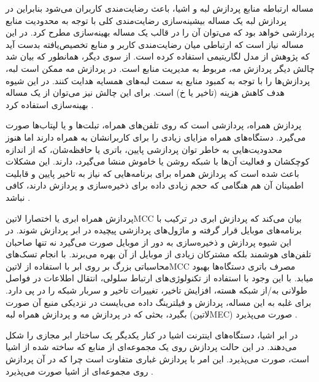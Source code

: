 مساله ارتباطه منابع پردازش لبه و اشیا، باعث رضایت‌مندی کاربران می‌شود بنابراین در پردازش لبه یک مساله بیشینه‌سازی رضایت‌مندی کلی با توجه به محدودیت منابع پردازشی خواهد بود
که می‌توان آن را در قالب یک مساله بهینه‌سازی مطرح کرد. در این مساله نیاز است که ارتباطی میان رضایت‌مندی کاربر و منابع تخصیص‌یافته بدست آید که پژوهش  از مدل
لگاریتیمی استفاده کرده است.
از سوی دیگر، همانطور که بیان شد چالش دیگر پردازش مه، مربوط به مدیریت منابع است. در پردازش مه ممکن است لبه‌، پردازش‌ها را با توجه به کمبود منابع به سمت لبه‌های همسایه هدایت کنند.
در این شیوه هدف کاهش هزینه (تاخیر یا ‌خ) است. برای این چالش نیز می‌توان از یک مساله بهینه‌سازی استفاده کرد
.


پردازش همراه، پردازشی است که روی تلفن‌های همراه، تبلت‌ها و یا لپتاب‌ها صورت می‌گیرد. دستگاه‌های همراه مزایای زیادی را برای کاربرانشان به همراه دارند اما هنوز
محدودیت‌هایی به خاطر توان پردازشی پایین، باتری یا حافظه‌شان، که از اندازه کوچکشان و فعالیت آن‌ها با شبکه روشن یا خاموش منشا می‌گیرد، دارند.
این مشکلات باعث شده است که پردازش همراه برای برنامه‌هایی که نیاز به تاخیر پایین و قابلیت اطمینان آن هم هنگامی که حجم زیادی داده برای ذخیره‌سازی و پردازش دارند، کافی نباشد
.


پردازش همراه ابری یا اختصارا ‌لاتین{MCC} بیان می‌کند که پردازش ابری در ترکیب با برنامه‌های موبایل قرار گرفته و ماژول‌های پردازشی پیچیده در ابر پردازش شوند.
در این شیوه پردازش و ذخیره‌سازی به دور از موبایل صورت می‌گیرد نه تنها صاحبان تلفن‌های هوشمند بلکه مشترکان زیادی از موبایل از آن بهره می‌برند.
با انجام تسک‌های محاسباتی بزرگ بر روی ابر با استفاده از ‌لاتین{MCC} مصرف باتری دستگاه‌ها بهبود میابد.
با این وجود با استفاده از تکنولوژی‌های ارتباط سلولی، انتقال اطلاعات در فواصل طولانی به/از شبکه هسته، افزایش تاخیر، تغییرات تاخیر و سربار شبکه را در پی دارد.
برای غلبه به این مساله، پردازش و فیلترینگ داده می‌بایست در نزدیکی منبع آن صورت بگیرد، بحثی که در پردازش مه و پردازش همراه لبه (‌لاتین{MEC}) صورت می‌پذیرد
.


در ابر اشیا، دستگاه‌های اینترنت اشیا در کنار یکدیگر یک ساختار ابر مجازی را شکل می‌دهند. در این حالت پردازش روی یک مجموعه‌ای از منابع که ساخته شده از اشیا است، صورت می‌پذیرد.
این امر با پردازش غباری متفاوت است چرا که در آن پردازش روی مجموعه‌ای از اشیا صورت می‌پذیرد
.


